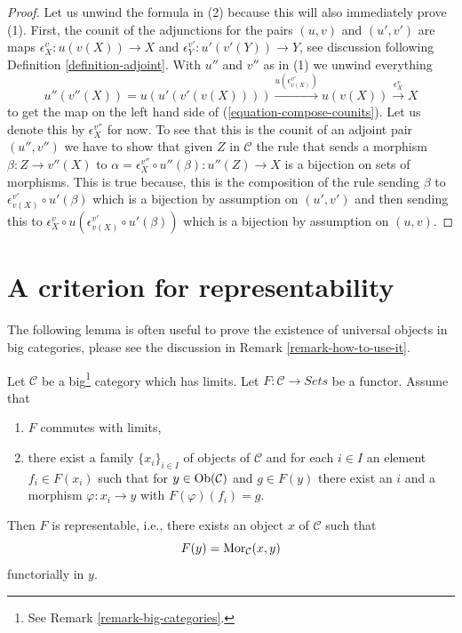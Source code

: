 \begin{proof}
Let us unwind the formula in (2) because this will also immediately
prove (1). First, the counit of the adjunctions for the pairs
$(u, v)$ and $(u', v')$ are maps
$\epsilon_X^v : u(v(X)) \to X$ and
$\epsilon_Y^{v'} : u'(v'(Y)) \to Y$, see discussion following
Definition \ref{definition-adjoint}.
With $u''$ and $v''$ as in (1) we unwind everything
$$
u''(v''(X)) = u(u'(v'(v(X)))) \xrightarrow{u(\epsilon_{v(X)}^{v'})}
u(v(X)) \xrightarrow{\epsilon_X^v} X
$$
to get the map on the left hand side of (\ref{equation-compose-counits}).
Let us denote this by $\epsilon_X^{v''}$ for now.
To see that this is the counit of an adjoint pair
$(u'', v'')$ we have to show that given $Z$ in $\mathcal{C}$
the rule that sends a morphism $\beta : Z \to v''(X)$
to $\alpha = \epsilon_X^{v''} \circ u''(\beta) : u''(Z) \to X$
is a bijection on sets of morphisms.
This is true because, this is the composition of the
rule sending $\beta$ to $\epsilon_{v(X)}^{v'} \circ u'(\beta)$
which is a bijection by assumption on $(u', v')$ and then
sending this to
$\epsilon_X^v \circ u(\epsilon_{v(X)}^{v'} \circ u'(\beta))$
which is a bijection by assumption on $(u, v)$.
\end{proof}






\section{A criterion for representability}
\label{section-representable}

\noindent
The following lemma is often useful to prove the existence of
universal objects in big categories, please see the discussion
in Remark \ref{remark-how-to-use-it}.

\begin{lemma}
\label{lemma-a-version-of-brown}
Let $\mathcal{C}$ be a big\footnote{See Remark \ref{remark-big-categories}.}
category which has limits. Let $F : \mathcal{C} \to \textit{Sets}$ be a
functor. Assume that
\begin{enumerate}
\item $F$ commutes with limits,
\item there exist a family $\{x_i\}_{i \in I}$ of objects of $\mathcal{C}$
and for each $i \in I$ an element $f_i \in F(x_i)$
such that for $y \in \mathop{\mathrm{Ob}}\nolimits(\mathcal{C})$ and $g \in F(y)$
there exist an $i$ and a morphism $\varphi : x_i \to y$
with $F(\varphi)(f_i) = g$.
\end{enumerate}
Then $F$ is representable, i.e., there exists an object $x$
of $\mathcal{C}$ such that
$$
F(y) = \mathop{\mathrm{Mor}}\nolimits_\mathcal{C}(x, y)
$$
functorially in $y$.
\end{lemma}

